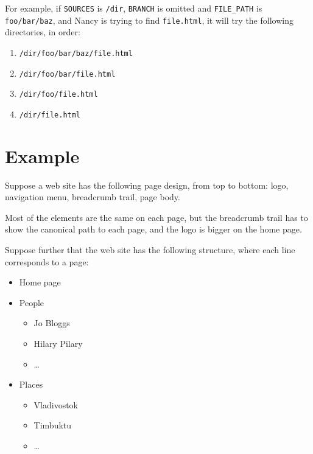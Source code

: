 \documentclass[english]{scrartcl}
\begin{document}
For example, if \verb|SOURCES| is \verb|/dir|, \verb|BRANCH| is omitted and \verb|FILE_PATH| is \verb|foo/bar/baz|, and Nancy is trying to find \verb|file.html|, it will try the following directories, in order:

\begin{enumerate}
\item \verb|/dir/foo/bar/baz/file.html|
\item \verb|/dir/foo/bar/file.html|
\item \verb|/dir/foo/file.html|
\item \verb|/dir/file.html|
\end{enumerate}

\section{Example}

Suppose a web site has the following page design, from top to bottom: logo, navigation menu, breadcrumb trail, page body.

Most of the elements are the same on each page, but the breadcrumb trail has to show the canonical path to each page, and the logo is bigger on the home page.

Suppose further that the web site has the following structure, where each line corresponds to a page:

\begin{itemize}
\item Home page
\item People
  \begin{itemize}
  \item Jo Bloggs
  \item Hilary Pilary
  \item \dots
  \end{itemize}
\item Places
  \begin{itemize}
  \item Vladivostok
  \item Timbuktu
  \item \dots
  \end{itemize}
\end{itemize}
\end{document}
